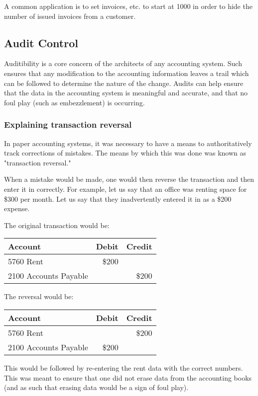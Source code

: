 \documentclass{article}
\begin{document}
A common application is to set invoices, etc. to start at 1000 in order to hide
the number of issued invoices from a customer.

\subsection{Audit Control}

Auditibility is a core concern of the architects of any accounting system.  Such
ensures that any modification to the accounting information leaves a trail which
can be followed to determine the nature of the change.  Audits can help ensure
that the data in the accounting system is meaningful and accurate, and that no
foul play (such as embezzlement) is occurring.

\subsubsection{Explaining transaction reversal}
In paper accounting systems, it was necessary to have a means to authoritatively
track corrections of mistakes.  The means by which this was done was known as
"transaction reversal."

When a mistake would be made, one would then reverse the transaction and then
enter it in correctly.  For example, let us say that an office was renting space
for \$300 per month.  Let us say that they inadvertently entered it in as a
\$200 expense.

The original transaction would be:

\begin{tabular}{l|r|r}
Account & Debit & Credit \\
\hline
5760 Rent & \$200 & \\
2100 Accounts Payable & & \$200\\
\end{tabular}

The reversal would be:

\begin{tabular}{l|r|r}
Account & Debit & Credit \\
\hline
5760 Rent  & & \$200\\
2100 Accounts Payable &\$200 & \\
\end{tabular}

This would be followed by re-entering the rent data with the correct numbers.
This was meant to ensure that one did not erase data from the accounting books
(and as such that erasing data would be a sign of foul play).
\end{document}
